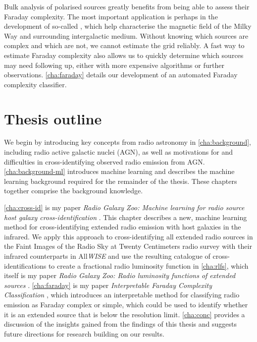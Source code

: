     Bulk analysis of polarised sources greatly benefits from being able to assess their Faraday complexity. The most important application is perhaps in the development of so-called , which help characterise the magnetic field of the Milky Way and surrounding intergalactic medium. Without knowing which sources are complex and which are not, we cannot estimate the grid reliably. A fast way to estimate Faraday complexity also allows us to quickly determine which sources may need following up, either with more expensive algorithms or further observations. \autoref{cha:faraday} details our development of an automated Faraday complexity classifier.

\section{Thesis outline}
\label{sec:outline}

We begin by introducing key concepts from radio astronomy in \autoref{cha:background}, including radio active galactic nuclei (AGN), as well as motivations for and difficulties in cross-identifying observed radio emission from AGN. \autoref{cha:background-ml} introduces machine learning and describes the machine learning background required for the remainder of the thesis. These chapters together comprise the background knowledge.

\autoref{cha:cross-id} is my paper \emph{Radio Galaxy Zoo: Machine learning for radio source host galaxy cross-identification} \citep{alger18radio}. This chapter describes a new, machine learning method for cross-identifying extended radio emission with host galaxies in the infrared. We apply this approach to cross-identifying all extended radio sources in the Faint Images of the Radio Sky at Twenty Centimeters radio survey \citep[FIRST;][]{becker95first} with their infrared counterparts in All\emph{WISE} \citep{cutri2013wiseexplanatory} and use the resulting catalogue of cross-identifications to create a fractional radio luminosity function in \autoref{cha:rlfs}, which itself is my paper \emph{Radio Galaxy Zoo: Radio luminosity functions of extended sources} \citep{alger21rlfs}. \autoref{cha:faraday} is my paper \emph{Interpretable Faraday Complexity Classification} \citep{alger2021interpretable}, which introduces an interpretable method for classifying radio emission as Faraday complex or simple, which could be used to identify whether it is an extended source that is below the resolution limit. \autoref{cha:conc} provides a discussion of the insights gained from the findings of this thesis and suggests future directions for research building on our results.

